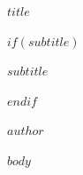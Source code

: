 \documentclass[11pt,openany]{book}
\begin{document}
\thispagestyle{empty}
\vspace*{0.20\textheight}
\begin{center}
{\fontsize{24}{28}\selectfont\bfseries $title$\par}
$if(subtitle)$
\vspace{0.6em}
{\large $subtitle$\par}
$endif$
\vfill
{\large $author$\par}
\end{center}
\clearpage

\frontmatter
\tableofcontents
\clearpage
\mainmatter
\setcounter{page}{1}

$body$
\end{document}
